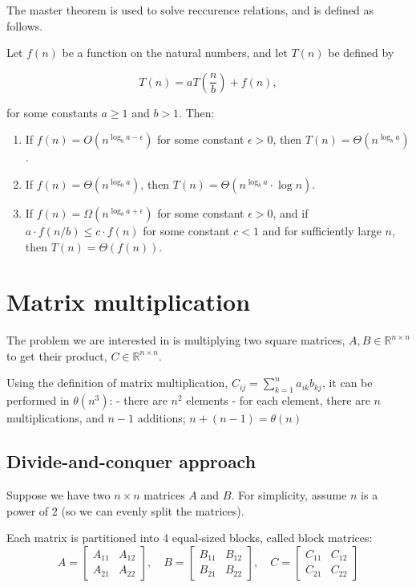 \documentclass[11pt]{article}
\begin{document}
The master theorem is used to solve reccurence relations, and is defined
as follows.

Let \(f(n)\) be a function on the natural numbers, and let \(T(n)\) be
defined by

\[
T(n) = aT\left(\frac{n}{b}\right) + f(n),
\]

for some constants \(a \ge 1\) and \(b > 1\). Then:

\begin{enumerate}
\def\labelenumi{\arabic{enumi}.}
\item
  If \(f(n) = O(n^{\log_b a - \epsilon})\) for some constant
  \(\epsilon > 0\), then \(T(n) = \Theta(n^{\log_b a})\).
\item
  If \(f(n) = \Theta(n^{\log_b a})\), then
  \(T(n) = \Theta(n^{\log_b a} \cdot \log n)\).
\item
  If \(f(n) = \Omega(n^{\log_b a + \epsilon})\) for some constant
  \(\epsilon > 0\), and if \(a \cdot f(n/b) \le c \cdot f(n)\) for some
  constant \(c < 1\) and for sufficiently large \(n\), then
  \(T(n) = \Theta(f(n))\).
\end{enumerate}

    \section{Matrix multiplication}\label{matrix-multiplication}

The problem we are interested in is multiplying two square matrices,
\(A, B \in \mathbb{R}^{n \times n}\) to get their product,
\(C \in \mathbb{R}^{n \times n}\).

Using the definition of matrix multiplication,
\(C_{ij} = \sum_{k=1}^n a_{ik} b_{kj}\), it can be performed in
\(\theta(n^3)\): - there are \(n^2\) elements - for each element, there
are \(n\) multiplications, and \(n-1\) additions;
\(n + (n-1) = \theta(n)\)

\subsection{Divide-and-conquer
approach}\label{divide-and-conquer-approach}

Suppose we have two \(n \times n\) matrices \(A\) and \(B\). For
simplicity, assume \(n\) is a power of 2 (so we can evenly split the
matrices).

Each matrix is partitioned into 4 equal-sized blocks, called block
matrices: \[
A = \begin{bmatrix} A_{11} & A_{12} \\ A_{21} & A_{22} \end{bmatrix}, \quad
B = \begin{bmatrix} B_{11} & B_{12} \\ B_{21} & B_{22} \end{bmatrix}, \quad
C = \begin{bmatrix} C_{11} & C_{12} \\ C_{21} & C_{22} \end{bmatrix}
\]
\end{document}
